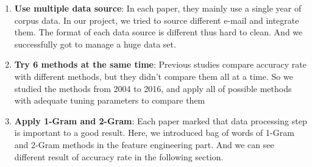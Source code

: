 \begin{enumerate}
	\item \textbf{Use multiple data source}: In each paper, they mainly use a single year of corpus data. In our project, we tried to source different e-mail and integrate them. The format of each data source is different thus hard to clean. And we successfully got to manage a huge data set. 
	\item \textbf{Try 6 methods at the same time}: Previous studies compare accuracy rate with different methods, but they didn't compare them all at a time. So we studied the methods from 2004 to 2016, and apply all of possible methods with adequate tuning parameters to compare them 
	\item \textbf{Apply 1-Gram and 2-Gram}: Each paper marked that data processing step is important to a good result. Here, we introduced bag of words of 1-Gram and 2-Gram methods in the feature engineering part. And we can see different result of accuracy rate in the following section.
\end{enumerate}
